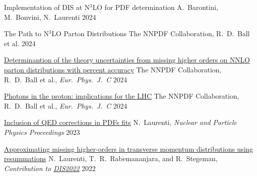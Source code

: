 
\begin{cvhonors}

    \cvhonor
    {Implementation of DIS at N$^3$LO for PDF determination} %
    {A.\ Barontini, M.\ Bonvini, N.\ Laurenti} %
    {}
    {2024}
    
    \cvhonor
    {The Path to N$^3$LO Parton Distributions} %
    {The NNPDF Collaboration, R.\ D.\ Ball et al.} %
    {}
    {2024}
    
    \cvhonor
    {\href{https://arxiv.org/pdf/2401.10319.pdf}{Determinantion of the theory uncertainties from missing higher orders on NNLO parton distributions with percent accuracy}} %
    {The NNPDF Collaboration, R.\ D.\ Ball et al., \emph{Eur.\ Phys.\ J.\ C}} %
    {}
    {2024}
    
    \cvhonor
    {\href{https://arxiv.org/pdf/2401.08749.pdf}{Photons in the proton: implications for the LHC}} %
    {The NNPDF Collaboration, R.\ D.\ Ball et al., \emph{Eur.\ Phys.\ J.\ C}} %
    {}
    {2024}

    \cvhonor
    {\href{https://doi.org/10.1016/j.nuclphysbps.2023.11.013}{Inclusion of QED corrections in PDFs ﬁts}}
    {N.\ Laurenti, \textit{Nuclear and Particle Physics Proceedings}}
    {}
    {2023}
    
    \cvhonor
    {\href{https://arxiv.org/abs/2207.12265}{Approximating missing higher-orders in transverse momentum distributions using resummations}}
    {N.~Laurenti, T.\ R.\ Rabemananjara, and R.\ Stegeman, \emph{Contribution to \href{https://inspirehep.net/conferences/1914506?ui-citation-summary=true}{DIS2022}}}
    {}
    {2022}

\end{cvhonors}